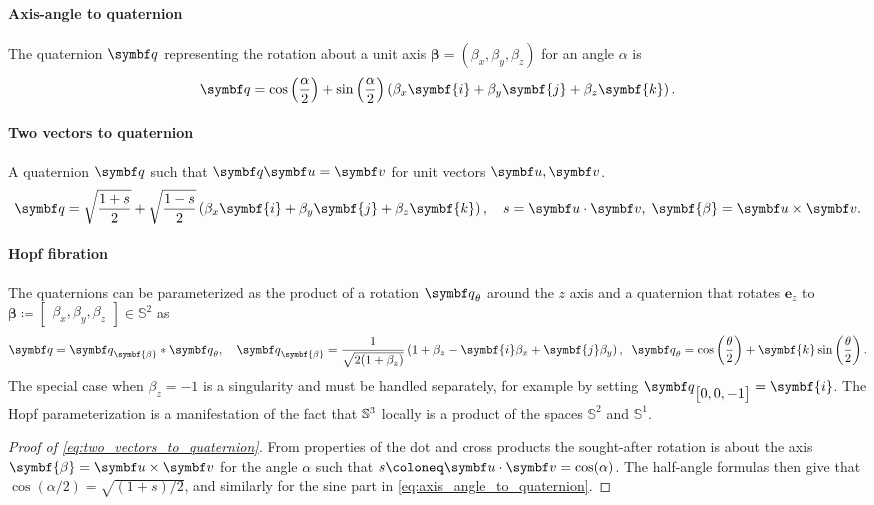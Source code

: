 \begin{properties}[title=Useful quaternion identities]
  \paragraph{Axis-angle to quaternion} The quaternion $\bq$ representing the rotation about a unit axis $\symbf{\beta} = (\beta_x, \beta_y, \beta_z)$ for an angle $\alpha$ is
  \begin{equation}
    \label{eq:axis_angle_to_quaternion}
    \bq = \cos \left( \frac{\alpha}{2} \right) + \sin \left( \frac{\alpha}{2} \right) \left( \beta_x \symbf{i} + \beta_y \symbf{j} + \beta_z \symbf{k} \right).
  \end{equation}
  \paragraph{Two vectors to quaternion} A quaternion $\bq$ such that $\bq \bu = \bv$ for unit vectors $\bu, \bv$.
  \begin{equation}
    \label{eq:two_vectors_to_quaternion}
    \bq = \sqrt{\frac{1 + s}{2}} + \sqrt{\frac{1 - s}{2}} \left( \beta_x \symbf{i} + \beta_y \symbf{j} + \beta_z \symbf{k} \right), \quad s = \bu \cdot \bv, \; \symbf{\beta} = \bu \times \bv.
  \end{equation}
  \paragraph{Hopf fibration} The quaternions can be parameterized as the product of a rotation $\bq_\theta$ around the $z$ axis and a quaternion that rotates $\symbf{e}_z$ to $\symbf{\beta} \coloneq \begin{bmatrix} \beta_x, \beta_y, \beta_z \end{bmatrix} \in \mathbb{S}^2$ as
  \begin{equation}
    \bq = \bq_{\symbf{\beta}} * \bq_{\theta}, \quad \bq_{\symbf{\beta}} = \frac{1}{\sqrt{2(1 + \beta_z)}} \left( 1 + \beta_z - \symbf{i} \beta_x + \symbf{j} \beta_y \right), \; \; \bq_{\theta} = \cos \left( \frac{\theta}{2} \right) + \symbf{k} \sin \left( \frac{\theta}{2} \right).
  \end{equation}
  The special case when $\beta_z = -1$ is a singularity and must be handled separately, for example by setting $\bq_{\begin{bmatrix}0, 0, -1\end{bmatrix}} = \symbf{i}$. The Hopf parameterization is a manifestation of the fact that ${\mathbb{S}^3}$ locally is a product of the spaces $\mathbb{S}^2$ and $\mathbb{S}^1$.
\end{properties}
\begin{proof}[Proof of \eqref{eq:two_vectors_to_quaternion}]
  From properties of the dot and cross products the sought-after rotation is about the axis $\symbf{\beta} = \bu \times \bv$ for the angle $\alpha$ such that $s \coloneq \bu \cdot \bv = \cos (\alpha)$. The half-angle formulas then give that $\cos (\alpha / 2) = \sqrt{(1 + s) / 2}$, and similarly for the sine part in \eqref{eq:axis_angle_to_quaternion}.
\end{proof}

